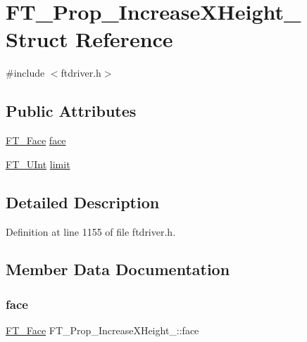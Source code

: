 \hypertarget{struct_f_t___prop___increase_x_height__}{}\section{F\+T\+\_\+\+Prop\+\_\+\+Increase\+X\+Height\+\_\+ Struct Reference}
\label{struct_f_t___prop___increase_x_height__}


{\ttfamily \#include $<$ftdriver.\+h$>$}

\subsection*{Public Attributes}
\begin{DoxyCompactItemize}
\item 
\mbox{\hyperlink{freetype_8h_a7eba045ee20968354fa1bff0f69740fa}{F\+T\+\_\+\+Face}} \mbox{\hyperlink{struct_f_t___prop___increase_x_height___ae761b2b7e3e086b3d672f16f5cc48643}{face}}
\item 
\mbox{\hyperlink{fttypes_8h_abcb8db4dbf35d2b55a9e8c7b0926dc52}{F\+T\+\_\+\+U\+Int}} \mbox{\hyperlink{struct_f_t___prop___increase_x_height___ae276b4241881f9e8ea57fd3a9e9c0d8a}{limit}}
\end{DoxyCompactItemize}


\subsection{Detailed Description}


Definition at line 1155 of file ftdriver.\+h.



\subsection{Member Data Documentation}
\mbox{\label{struct_f_t___prop___increase_x_height___ae761b2b7e3e086b3d672f16f5cc48643}} 
\subsubsection{\texorpdfstring{face}{face}}
{\footnotesize\ttfamily \mbox{\hyperlink{freetype_8h_a7eba045ee20968354fa1bff0f69740fa}{F\+T\+\_\+\+Face}} F\+T\+\_\+\+Prop\+\_\+\+Increase\+X\+Height\+\_\+\+::face}



